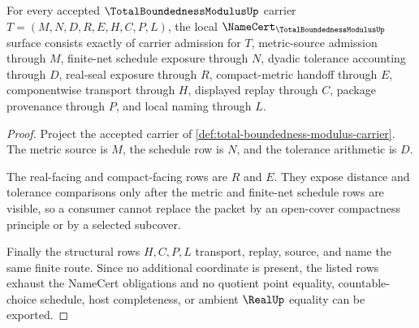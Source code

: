 \begin{theorem}
\label{thm:total-boundedness-modulus-namecert-obligations}
For every accepted $\TotalBoundednessModulusUp$ carrier $T=(M,N,D,R,E,H,C,P,L)$, the local $\NameCert_{\TotalBoundednessModulusUp}$ surface consists exactly of carrier admission for $T$, metric-source admission through $M$, finite-net schedule exposure through $N$, dyadic tolerance accounting through $D$, real-seal exposure through $R$, compact-metric handoff through $E$, componentwise transport through $H$, displayed replay through $C$, package provenance through $P$, and local naming through $L$.
\end{theorem}
\begin{proof}
Project the accepted carrier of \autoref{def:total-boundedness-modulus-carrier}. The metric source is $M$, the schedule row is $N$, and the tolerance arithmetic is $D$.

The real-facing and compact-facing rows are $R$ and $E$. They expose distance and tolerance comparisons only after the metric and finite-net schedule rows are visible, so a consumer cannot replace the packet by an open-cover compactness principle or by a selected subcover.

Finally the structural rows $H,C,P,L$ transport, replay, source, and name the same finite route. Since no additional coordinate is present, the listed rows exhaust the NameCert obligations and no quotient point equality, countable-choice schedule, host completeness, or ambient $\RealUp$ equality can be exported.
\end{proof}

